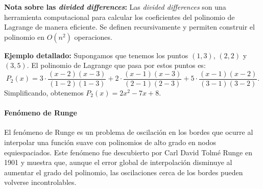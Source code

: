 \documentclass[12pt, a4paper]{article}
\theoremstyle{rioplatense}
\begin{document}
\textbf{Nota sobre las \textit{divided differences}:}
Las \textit{divided differences} son una herramienta computacional para calcular los coeficientes del polinomio de Lagrange de manera eficiente. Se definen recursivamente y permiten construir el polinomio en \( O(n^2) \) operaciones.

\begin{flushleft}
\textbf{Ejemplo detallado:}
Supongamos que tenemos los puntos \( (1, 3) \), \( (2, 2) \) y \( (3, 5) \). El polinomio de Lagrange que pasa por estos puntos es:
\[
P_2(x) = 3 \cdot \frac{(x-2)(x-3)}{(1-2)(1-3)} + 2 \cdot \frac{(x-1)(x-3)}{(2-1)(2-3)} + 5 \cdot \frac{(x-1)(x-2)}{(3-1)(3-2)}.
\]
Simplificando, obtenemos \( P_2(x) = 2x^2 - 7x + 8 \).
\end{flushleft}

\begin{center}
\end{center}

\paragraph{Fenómeno de Runge}
El fenómeno de Runge es un problema de oscilación en los bordes que ocurre al interpolar una función suave con polinomios de alto grado en nodos equiespaciados. Este fenómeno fue descubierto por Carl David Tolmé Runge en 1901 y muestra que, aunque el error global de interpolación disminuye al aumentar el grado del polinomio, las oscilaciones cerca de los bordes pueden volverse incontrolables.
\end{document}
